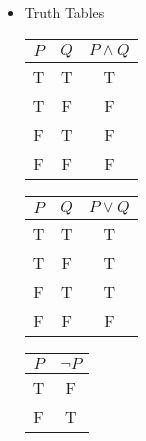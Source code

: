 \documentclass[10pt,english]{beamer}
\begin{document}
\begin{frame}
\begin{itemize}
\vspace{0.5mm}
\item Truth Tables \\
  \begin{center}
  \begin{tabular}{|c|c|c|}
  \hline
  $P$ & $Q$ & $P \wedge Q$ \\
  \hline
  T & T & T \\
  T & F & F \\
  F & T & F \\
  F & F & F \\
  \hline
  \end{tabular}
  \hspace{3mm}
  \begin{tabular}{|c|c|c|}
  \hline
  $P$ & $Q$ & $P \vee Q$ \\
  \hline
  T & T & T \\
  T & F & T \\
  F & T & T \\
  F & F & F \\
  \hline
  \end{tabular}
  \hspace{3mm}
  \begin{tabular}{|c|c|}
  \hline
  $P$ & $\neg P$ \\
  \hline
  T & F \\
  F & T \\
  \hline
  \end{tabular}
  \end{center}
  
  
\end{itemize}

\end{frame}
\end{document}
